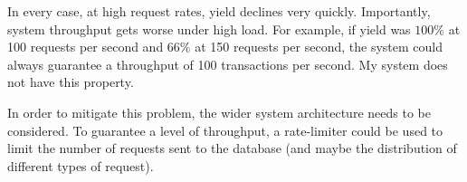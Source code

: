 \documentclass[12pt,a4paper,twoside,openany]{report}
\begin{document}



In every case, at high request rates, yield declines very quickly. Importantly, system throughput gets worse under high load. For example, if yield was $100\%$ at 100 requests per second and $66\%$ at 150 requests per second, the system could always guarantee a throughput of 100 transactions per second. My system does not have this property.

In order to mitigate this problem, the wider system architecture needs to be considered. To guarantee a level of throughput, a rate-limiter could be used to limit the number of requests sent to the database (and maybe the distribution of different types of request).


\end{document}
